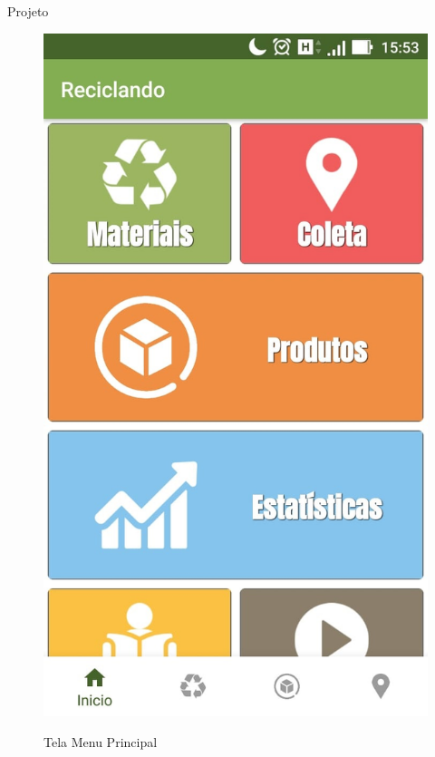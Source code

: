 \documentclass[
	12pt,				%
	openany,			%
	twoside,			%
	a4paper,			%
	english,			%
	french,				%
	spanish,			%
	brazil				%
	]{abntex2}
\begin{document}
\begin{chapter}{Projeto}
\begin{figure}[h]
\centering
   \caption{Tela Menu Principal}
   \includegraphics[scale=0.4]{media/fragment_main.jpg}
     \label{fig:fragment_main_app}
\end{figure}

\newpage

\end{chapter}
\end{document}
